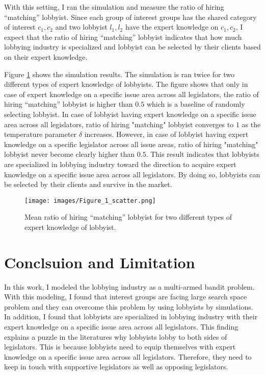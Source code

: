 \documentclass{article}
\begin{document}
With this setting, I ran the simulation and measure 
the ratio of hiring ``matching'' lobbyist. 
Since each group of interest groups has the shared category of interest $c_1, c_2$
and two lobbyist $l_1, l_2$ have the expert knowledge on $c_1, c_2$, 
I expect that the ratio of hiring ``matching'' lobbyist indicates that 
how much lobbying industry is specialized and 
lobbyist can be selected by their clients based on their expert knowledge.

Figure \ref{fig:specialization} shows the simulation results.
The simulation is ran twice for two different types of expert knowledge of lobbyists.
The figure shows that only in case of expert knowledge on a specific issue area across all legislators,
the ratio of hiring ``matching'' lobbyist is higher than $0.5$ which is a baseline of randomly selecting lobbyist.
In case of lobbyist having expert knowledge on a specific issue area across all legislators,
ratio of hiring "matching" lobbyist converges to $1$ as the temperature parameter $\delta$ increases. 
However, in case of lobbyist having expert knowledge on a specific legislator across all issue areas,
ratio of hiring "matching" lobbyist never become clearly higher than $0.5$.
This result indicates that lobbyists are specialized in lobbying industry
toward the direction to acquire expert knowledge on a specific issue area across all legislators.
By doing so, lobbyists can be selected by their clients and survive in the market.

\begin{figure}[h!]
    \centering
    \texttt{[image: images/Figure\_1\_scatter.png]}
    \caption{Mean ratio of hiring ``matching'' lobbyist for two different types of expert knowledge of lobbyist.}
    \label{fig:specialization}
\end{figure}

\section{Conclsuion and Limitation}

In this work, 
I modeled the lobbying industry as a multi-armed bandit problem.
With this modeling, I found that 
interest groups are facing large search space problem 
and they can overcome this problem by using lobbyists by simulations.
In addition, I found that lobbyists are specialized in lobbying industry
with their expert knowledge on a specific issue area across all legislators.
This finding explains a puzzle in the literatures why lobbyists lobby to both sides of legislators.
This is because lobbyists need to equip themselves with expert knowledge on a specific issue area across all legislators.
Therefore, they need to keep in touch with supportive legislators as well as opposing legislators.
\end{document}
